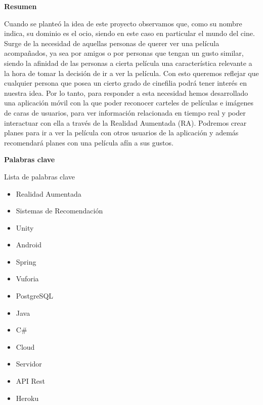 
\newpage

\thispagestyle{empty}

\begin{center}

{\bf \Huge Resumen}

  \end{center}
\vspace{1cm}

Cuando se planteó la idea de este proyecto observamos que, como su nombre indica, 
su dominio es el ocio, siendo en este caso en particular el mundo del cine.
Surge de la necesidad de aquellas personas de querer ver una película acompañados, 
ya sea por amigos o por personas que tengan un gusto similar, 
siendo la afinidad de las personas a cierta película una característica relevante a 
la hora de tomar la decisión de ir a ver la película. Con esto queremos reflejar que 
cualquier persona que posea un cierto grado de cinefilia podrá tener interés en nuestra 
idea.
Por lo tanto, para responder a esta necesidad hemos desarrollado una aplicación móvil 
con la que poder reconocer carteles de películas e imágenes de caras de usuarios, para 
ver información relacionada en tiempo real y poder interactuar con ella a 
través de la Realidad Aumentada (RA). Podremos crear planes para ir a ver la película con otros 
usuarios de la aplicación y además recomendará planes con una película afín a sus gustos.


\vspace{1cm}


\begin{center}

{\bf \Large Palabras clave}

   \end{center}

   \vspace{0.5cm}
   
   Lista de palabras clave
   \begin{itemize}  
    \item Realidad Aumentada
    \item Sistemas de Recomendación
    \item Unity
    \item Android
    \item Spring
    \item Vuforia
    \item PostgreSQL
    \item Java
    \item C\#
    \item Cloud
    \item Servidor
    \item API Rest
    \item Heroku
  \end{itemize}
   


